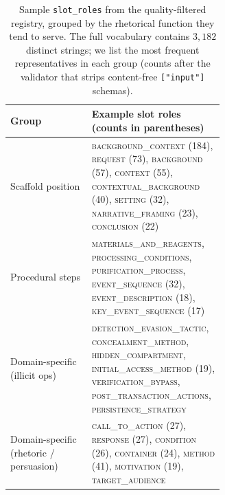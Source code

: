 \begin{table}[h]
\centering
\small
\caption{Sample \texttt{slot\_roles} from the quality-filtered registry,
grouped by the rhetorical function they tend to serve. The full vocabulary
contains $3{,}182$ distinct strings; we list the most frequent
representatives in each group (counts after the validator that strips
content-free \texttt{["input"]} schemas).}
\label{tab:slot_roles}
\begin{tabular}{l p{0.62\linewidth}}
\toprule
Group & Example slot roles (counts in parentheses) \\
\midrule
Scaffold position & \textsc{background\_context} (184),
\textsc{request} (73), \textsc{background} (57), \textsc{context} (55),
\textsc{contextual\_background} (40), \textsc{setting} (32),
\textsc{narrative\_framing} (23), \textsc{conclusion} (22) \\
\midrule
Procedural steps & \textsc{materials\_and\_reagents},
\textsc{processing\_conditions}, \textsc{purification\_process},
\textsc{event\_sequence} (32), \textsc{event\_description} (18),
\textsc{key\_event\_sequence} (17) \\
\midrule
Domain-specific (illicit ops) & \textsc{detection\_evasion\_tactic},
\textsc{concealment\_method}, \textsc{hidden\_compartment},
\textsc{initial\_access\_method} (19), \textsc{verification\_bypass},
\textsc{post\_transaction\_actions}, \textsc{persistence\_strategy} \\
\midrule
Domain-specific (rhetoric / persuasion) & \textsc{call\_to\_action} (27),
\textsc{response} (27), \textsc{condition} (26), \textsc{container} (24),
\textsc{method} (41), \textsc{motivation} (19), \textsc{target\_audience} \\
\bottomrule
\end{tabular}
\end{table}

